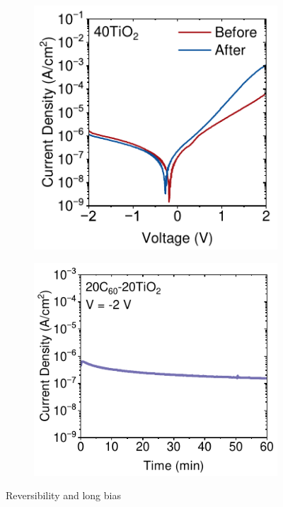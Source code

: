 \begin{figure}[htbp]
    \centering
    \begin{subfigure}[t]{0.45\textwidth} %
        \centering
        \includegraphics[width=\textwidth]{chapters/transport_layers/images/JV_Before_After_40TiO2.pdf} %
        \caption{}
        \label{}
    \end{subfigure}
    \hfill %
    \begin{subfigure}[t]{0.49\textwidth} %
        \centering
        \includegraphics[width=\textwidth]{chapters/transport_layers/images/JV_1hr_20_20.pdf} %
        \caption{}
        \label{}
    \end{subfigure}

    \caption{Reversibility and long bias}
    \label{}
\end{figure}


